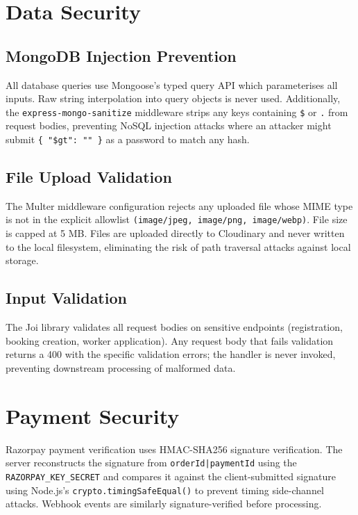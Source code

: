 \documentclass[12pt,a4paper]{report}
\begin{document}
\section{Data Security}

\subsection{MongoDB Injection Prevention}

All database queries use Mongoose's typed query API which parameterises all inputs. Raw string interpolation into query objects is never used. Additionally, the \texttt{express-mongo-sanitize} middleware strips any keys containing \texttt{\$} or \texttt{.} from request bodies, preventing NoSQL injection attacks where an attacker might submit \texttt{\{ "\$gt": "" \}} as a password to match any hash.

\subsection{File Upload Validation}

The Multer middleware configuration rejects any uploaded file whose MIME type is not in the explicit allowlist \texttt{(image/jpeg, image/png, image/webp)}. File size is capped at 5 MB. Files are uploaded directly to Cloudinary and never written to the local filesystem, eliminating the risk of path traversal attacks against local storage.

\subsection{Input Validation}

The Joi library validates all request bodies on sensitive endpoints (registration, booking creation, worker application). Any request body that fails validation returns a 400 with the specific validation errors; the handler is never invoked, preventing downstream processing of malformed data.

\section{Payment Security}

Razorpay payment verification uses HMAC-SHA256 signature verification. The server reconstructs the signature from \texttt{orderId|paymentId} using the \texttt{RAZORPAY\_KEY\_SECRET} and compares it against the client-submitted signature using Node.js's \texttt{crypto.timingSafeEqual()} to prevent timing side-channel attacks. Webhook events are similarly signature-verified before processing.
\end{document}
